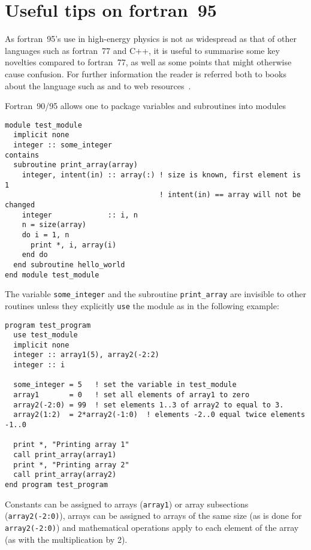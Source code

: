 \documentclass[12pt]{article}
\begin{document}
\appendix

\section{Useful tips on fortran~95}

As fortran~95's use in high-energy physics is not as widespread as
that of other languages such as fortran~77 and C++, it is useful to
summarise some key novelties compared to fortran~77, as well as some
points that might otherwise cause confusion. For further information
the reader is referred both to books about the language such as
\cite{F95Explained} and to web resources~\cite{F95WebResources}.

Fortran~90/95 allows one to package variables and subroutines into
modules
\begin{verbatim}
module test_module
  implicit none
  integer :: some_integer
contains
  subroutine print_array(array)
    integer, intent(in) :: array(:) ! size is known, first element is 1
                                    ! intent(in) == array will not be changed
    integer             :: i, n
    n = size(array)
    do i = 1, n
      print *, i, array(i)
    end do
  end subroutine hello_world
end module test_module
\end{verbatim}
The variable \texttt{some\_integer} and the subroutine
\texttt{print\_array} are invisible to other routines unless they
explicitly \texttt{use} the module as in the following example:
\begin{verbatim}
program test_program
  use test_module
  implicit none
  integer :: array1(5), array2(-2:2)
  integer :: i
  
  some_integer = 5   ! set the variable in test_module
  array1       = 0   ! set all elements of array1 to zero
  array2(-2:0) = 99  ! set elements 1..3 of array2 to equal to 3.
  array2(1:2)  = 2*array2(-1:0)  ! elements -2..0 equal twice elements -1..0

  print *, "Printing array 1"
  call print_array(array1)
  print *, "Printing array 2"
  call print_array(array2)
end program test_program
\end{verbatim}
Constants can be assigned to arrays (\texttt{array1}) or array
subsections (\texttt{array2(-2:0)}), arrays can be assigned to arrays
of the same size (as is done for \texttt{array2(-2:0)}) and
mathematical operations apply to each element of the array (as with
the multiplication by 2).
\end{document}
